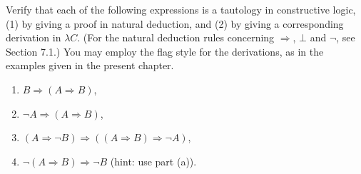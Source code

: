 \begin{problem}{7.1}
    Verify that each of the following expressions is a tautology in constructive logic, (1) by giving a proof in natural deduction, and (2) by giving a corresponding derivation in $\lambda C$.
    (For the natural deduction rules concerning $\Rightarrow$, $\bot$ and $\neg$, see Section 7.1.)
    You may employ the flag style for the derivations, as in the examples given in the present chapter.
    \begin{enumerate}[label=$(\alph*)$]
    \item $B\Rightarrow(A\Rightarrow B)$,
    \item $\neg A\Rightarrow(A\Rightarrow B)$,
    \item $(A\Rightarrow\neg B)\Rightarrow((A\Rightarrow B)\Rightarrow\neg A)$,
    \item $\neg(A\Rightarrow B)\Rightarrow\neg B$ (hint: use part (a)).
    \end{enumerate}
\end{problem}